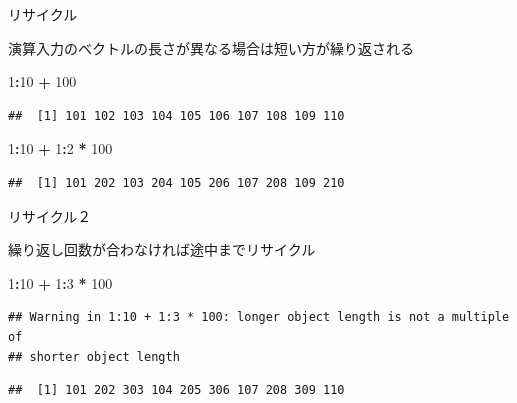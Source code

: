 \documentclass[ignorenonframetext,]{beamer}
\newenvironment{Shaded}{\begin{snugshade}}{\end{snugshade}}
\newcommand{\DecValTok}[1]{\textcolor[rgb]{0.00,0.00,0.81}{#1}}
\newcommand{\StringTok}[1]{\textcolor[rgb]{0.31,0.60,0.02}{#1}}
\newcommand{\OperatorTok}[1]{\textcolor[rgb]{0.81,0.36,0.00}{\textbf{#1}}}
\begin{document}
\begin{frame}[fragile]{リサイクル}

演算入力のベクトルの長さが異なる場合は短い方が繰り返される

\begin{Shaded}
\begin{Highlighting}[]
\DecValTok{1}\OperatorTok{:}\DecValTok{10} \OperatorTok{+}\StringTok{ }\DecValTok{100}
\end{Highlighting}
\end{Shaded}

\begin{verbatim}
##  [1] 101 102 103 104 105 106 107 108 109 110
\end{verbatim}

\begin{Shaded}
\begin{Highlighting}[]
\DecValTok{1}\OperatorTok{:}\DecValTok{10} \OperatorTok{+}\StringTok{ }\DecValTok{1}\OperatorTok{:}\DecValTok{2} \OperatorTok{*}\StringTok{ }\DecValTok{100}
\end{Highlighting}
\end{Shaded}

\begin{verbatim}
##  [1] 101 202 103 204 105 206 107 208 109 210
\end{verbatim}

\end{frame}

\begin{frame}[fragile]{リサイクル２}

繰り返し回数が合わなければ途中までリサイクル

\begin{Shaded}
\begin{Highlighting}[]
\DecValTok{1}\OperatorTok{:}\DecValTok{10} \OperatorTok{+}\StringTok{ }\DecValTok{1}\OperatorTok{:}\DecValTok{3} \OperatorTok{*}\StringTok{ }\DecValTok{100}
\end{Highlighting}
\end{Shaded}

\begin{verbatim}
## Warning in 1:10 + 1:3 * 100: longer object length is not a multiple of
## shorter object length
\end{verbatim}

\begin{verbatim}
##  [1] 101 202 303 104 205 306 107 208 309 110
\end{verbatim}

\end{frame}
\end{document}
